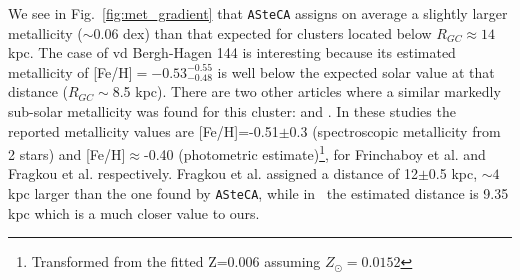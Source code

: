 \documentclass[draft]{aa}
\begin{document}
  We see in Fig.~\ref{fig:met_gradient} that \texttt{ASteCA} assigns on
  average a slightly larger metallicity ($\sim$0.06 dex) than that
  expected for clusters located below $R_{GC}\approx14$ kpc.
  The case of vd Bergh-Hagen 144 is interesting because its estimated
  metallicity of [Fe/H]$=-0.53_{-0.48}^{-0.55}$ is well below the expected
  solar value at that distance ($R_{GC}\sim$8.5 kpc). There are two other
  articles where a similar markedly sub-solar metallicity was found
  for this cluster: \cite{Frinchaboy_2004} and \cite{Fragkou_2019}. In these
  studies the reported metallicity values are [Fe/H]=-0.51$\pm$0.3 
  (spectroscopic metallicity from 2 stars) and [Fe/H]$\approx$-0.40 (photometric
  estimate)\footnote{Transformed from the fitted Z=0.006 assuming
  $Z_{\odot}=0.0152$}, for Frinchaboy et al. and Fragkou et al. respectively.
  Fragkou et al. assigned a distance of 12$\pm$0.5 kpc, $\sim4$ kpc
  larger than the one found by \texttt{ASteCA}, while in~\cite{Frinchaboy_2004b}
  the estimated distance is 9.35 kpc which is a much closer value to ours.
\end{document}
